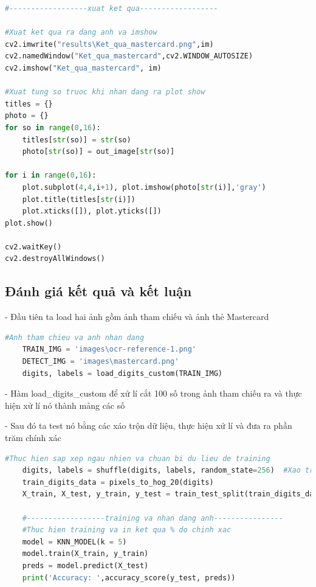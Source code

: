 \begin{lstlisting}[language=Python, caption=Recognition Mastercard]
#------------------xuat ket qua------------------

#Xuat ket qua ra dang anh va imshow
cv2.imwrite("results\Ket_qua_mastercard.png",im)
cv2.namedWindow("Ket_qua_mastercard",cv2.WINDOW_AUTOSIZE)
cv2.imshow("Ket_qua_mastercard", im)

#Xuat tung so truoc khi nhan dang ra plot show
titles = {}
photo = {}
for so in range(0,16):		
    titles[str(so)] = str(so)
    photo[str(so)] = out_image[str(so)]

for i in range(0,16):
	plot.subplot(4,4,i+1), plot.imshow(photo[str(i)],'gray')
	plot.title(titles[str(i)])
	plot.xticks([]), plot.yticks([])
plot.show()
    
cv2.waitKey() 
cv2.destroyAllWindows()          


\end{lstlisting}

\subsection{Đánh giá kết quả và kết luận}

- Đầu tiên ta load hai ảnh gồm ảnh tham chiếu và ảnh thẻ Mastercard
\begin{lstlisting}[language=Python]
    #Anh tham chieu va anh nhan dang
    TRAIN_IMG = 'images\ocr-reference-1.png'
    DETECT_IMG = 'images\mastercard.png'
    digits, labels = load_digits_custom(TRAIN_IMG)
\end{lstlisting}

- Hàm load\_digits\_custom để xử lí cắt 100 số trong ảnh tham chiếu ra và thực hiện xử lí nó thành mảng các số

- Sau đó ta test nó bằng các xáo trộn dữ liệu, thực hiện xử lí và đưa ra phần trăm chính xác

\begin{lstlisting}[language=Python]
    #Thuc hien sap xep ngau nhien va chuan bi du lieu de training
    digits, labels = shuffle(digits, labels, random_state=256)  #Xao tron du lieu
    train_digits_data = pixels_to_hog_20(digits)
    X_train, X_test, y_train, y_test = train_test_split(train_digits_data, labels, test_size=0.7)

    #------------------training va nhan dang anh----------------
    #Thuc hien training va in ket qua % do chinh xac
    model = KNN_MODEL(k = 5)
    model.train(X_train, y_train)
    preds = model.predict(X_test)
    print('Accuracy: ',accuracy_score(y_test, preds))
\end{lstlisting}


